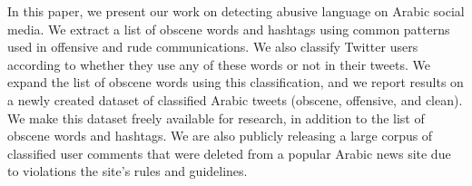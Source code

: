 In this paper, we present our work on detecting abusive language on Arabic social media. We extract a list of obscene words and hashtags using common patterns used in offensive and rude communications. We also classify Twitter users according to whether they use any of these words or not in their tweets. We expand the list of obscene words using this classification, and we report results on a newly created dataset of classified Arabic tweets (obscene, offensive, and clean). We make this dataset freely available for research, in addition to the list of obscene words and hashtags. We are also publicly releasing a large corpus of classified user comments that were deleted from a popular Arabic news site due to violations the site's rules and guidelines.
